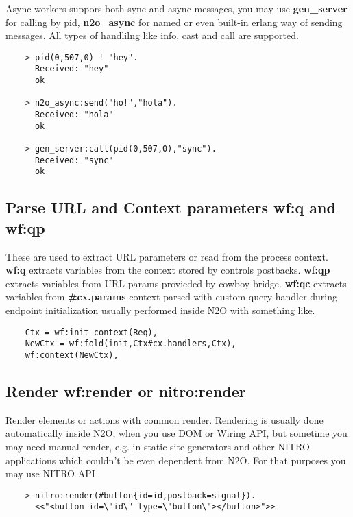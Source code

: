 Async workers suppors both sync and async messages, you may use {\bf gen\_server}
for calling by pid, {\bf n2o\_async} for named or even built-in erlang way of
sending messages. All types of handlilng like info, cast and call are supported.

\vspace{1\baselineskip}
\begin{lstlisting}
    > pid(0,507,0) ! "hey".
      Received: "hey"
      ok

    > n2o_async:send("ho!","hola").
      Received: "hola"
      ok

    > gen_server:call(pid(0,507,0),"sync").
      Received: "sync"
      ok
\end{lstlisting}
\vspace{1\baselineskip}

\subsection{Parse URL and Context parameters {\bf wf:q} and {\bf wf:qp}}
These are used to extract URL parameters or read from the process context.
{\bf wf:q} extracts variables from the context stored by controls postbacks.
{\bf wf:qp} extracts variables from URL params provieded by cowboy bridge.
{\bf wf:qc} extracts variables from {\bf \#cx.params} context parsed with
custom query handler during endpoint initialization usually performed
inside N2O with something like.

\vspace{1\baselineskip}
\begin{lstlisting}
    Ctx = wf:init_context(Req),
    NewCtx = wf:fold(init,Ctx#cx.handlers,Ctx),
    wf:context(NewCtx),
\end{lstlisting}
\vspace{1\baselineskip}

\newpage
\subsection{Render {\bf wf:render} or {\bf nitro:render}}
Render elements or actions with common render. Rendering is usually
done automatically inside N2O, when you use DOM or Wiring API, but sometime you may
need manual render, e.g. in static site generators and other NITRO applications
which couldn't be even dependent from N2O. For that purposes you may use NITRO API

\vspace{1\baselineskip}
\begin{lstlisting}
    > nitro:render(#button{id=id,postback=signal}).
      <<"<button id=\"id\" type=\"button\"></button>">>
\end{lstlisting}
\vspace{1\baselineskip}

